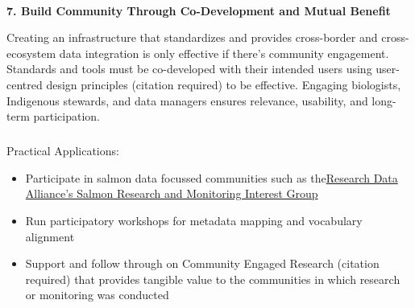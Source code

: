 \documentclass[
  letterpaper,
  DIV=11,
  numbers=noendperiod]{scrartcl}
\makeatletter
\let\oldparagraph\paragraph
\renewcommand{\paragraph}{
    \@ifstar
      \xxxParagraphStar
      \xxxParagraphNoStar
  }
\newcommand{\xxxParagraphStar}[1]{\oldparagraph*{#1}\mbox{}}
\newcommand{\xxxParagraphNoStar}[1]{\oldparagraph{#1}\mbox{}}
\let\oldsubparagraph\subparagraph
\renewcommand{\subparagraph}{
    \@ifstar
      \xxxSubParagraphStar
      \xxxSubParagraphNoStar
  }
\newcommand{\xxxSubParagraphStar}[1]{\oldsubparagraph*{#1}\mbox{}}
\newcommand{\xxxSubParagraphNoStar}[1]{\oldsubparagraph{#1}\mbox{}}
\makeatother
\begin{document}
\paragraph{\texorpdfstring{\textbf{7. Build Community Through
Co-Development and Mutual
Benefit}}{7. Build Community Through Co-Development and Mutual Benefit}}\label{build-community-through-co-development-and-mutual-benefit}

Creating an infrastructure that standardizes and provides cross-border
and cross-ecosystem data integration is only effective if there's
community engagement. Standards and tools must be co-developed with
their intended users using user-centred design principles (citation
required) to be effective. Engaging biologists, Indigenous stewards, and
data managers ensures relevance, usability, and long-term participation.

\subparagraph{Practical Applications:}\label{practical-applications-6}

\begin{itemize}
\item
  Participate in salmon data focussed communities such as
  the\href{https://www.rd-alliance.org/groups/salmon-research-and-monitoring-ig/}{Research
  Data Alliance's Salmon Research and Monitoring Interest Group}~
\item
  Run participatory workshops for metadata mapping and vocabulary
  alignment
\item
  Support and follow through on Community Engaged Research (citation
  required) that provides tangible value to the communities in which
  research or monitoring was conducted
\end{itemize}
\end{document}
